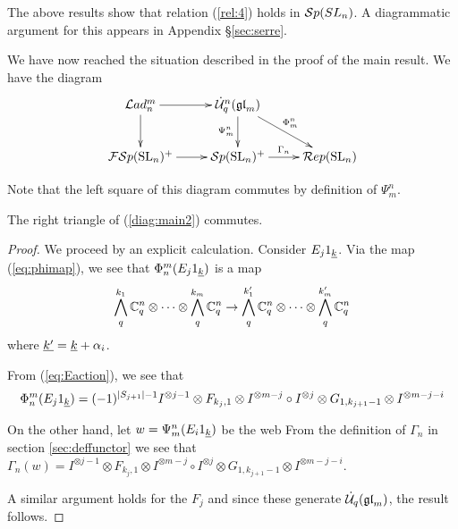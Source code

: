 \documentclass[10pt,leqno]{article}
\begin{document}
\begin{rem}
The above results show that relation  (\ref{rel:4}) holds in ${\mathcal{S}p}(SL_n)$.  A diagrammatic argument for this appears in Appendix \S \ref{sec:serre}.
\end{rem}

We have now reached the situation described in the proof of the main result.  We have the diagram
\begin{equation}\label{diag:main2}
\xymatrix{
\Lad_n^m \ar[r] \ar[d] & \dU^n(\gl_m) \ar[dr]^{\Phi_m^n} \ar[d]_{\Psi_m^n} & \\
\FSp(\SL_n)^+ \ar[r] & \Sp(\SL_n)^+ \ar[r]^{\Gamma_n} & \Rep(\SL_n) \\
}
\end{equation}

Note that the left square of this diagram commutes by definition of $\Psi^n_m $.

\begin{prop}
\label{prop:commutes}
The right triangle of (\ref{diag:main2}) commutes.
\end{prop}

\begin{proof}
We proceed by an explicit calculation.  Consider $ E_j 1_{{\underline{k}}}$.  Via the map (\ref{eq:phimap}), we see that $\Phi_n^m(E_j 1_{{\underline{k}}}) $ is a map
$$
\bigwedge_q^{k_1} {\mathbb{C}}_q^n \otimes \cdots \otimes \bigwedge_q^{k_m} {\mathbb{C}}_q^n \rightarrow \bigwedge^{k'_1}_q {\mathbb{C}}_q^n \otimes \cdots \otimes \bigwedge_q^{k'_m} {\mathbb{C}}_q^n
$$
where $ {\underline{k'}} = {\underline{k}} + \alpha_i $.

From (\ref{eq:Eaction}), we see that $$ \Phi_n^m(E_j 1_{{\underline{k}}}) = (-1)^{|S_{j+1}| -1} I^{\otimes j-1} \otimes F_{k_j,1} \otimes I^{\otimes m-j} \circ I^{\otimes j} \otimes G_{1, k_{j+1} - 1} \otimes I^{\otimes m-j - i} $$

On the other hand, let $ w = \Psi^n_m(E_i 1_{{\underline{k}}})$ be the web
From the definition of $\Gamma_n $ in section \ref{sec:deffunctor} we see that $ \Gamma_n(w) = I^{\otimes j-1} \otimes F_{k_j,1} \otimes I^{\otimes m-j} \circ I^{\otimes j} \otimes G_{1, k_{j+1} - 1} \otimes I^{\otimes m-j - i} $. 
  
A similar argument holds for the $F_j $ and since these generate $\dot{{\mathcal{U}}}_q({\mathfrak{gl}}_m) $, the result follows.

\end{proof}
\end{document}
